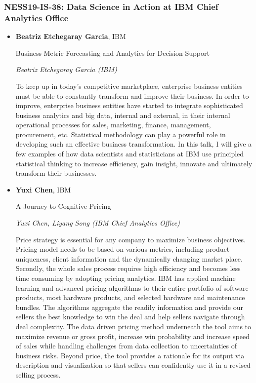 \subsubsection*{NESS19-IS-38: Data Science in Action at IBM Chief Analytics Office}

\begin{itemize}
\item \textbf{Beatriz Etchegaray Garcia}, IBM

Business Metric Forecasting and Analytics for Decision Support

\emph{\footnotesize Beatriz Etchegaray Garcia (IBM)}

To keep up in today's competitive marketplace, enterprise business entities must be able to constantly transform and improve their business. In order to improve, enterprise business entities have started to integrate sophisticated business analytics and big data, internal and external, in their internal operational processes for sales, marketing, finance, management, procurement, etc. Statistical methodology can play a powerful role in developing such an effective business transformation. In this talk, I will give a few examples of how data scientists and statisticians at IBM use principled statistical thinking to increase efficiency, gain insight, innovate and ultimately transform their businesses.

\item \textbf{Yuxi Chen}, IBM

A Journey to Cognitive Pricing

\emph{\footnotesize Yuxi Chen, Liyang Song (IBM Chief Analytics Office)}

Price strategy is essential for any company to maximize business objectives.  Pricing model needs to be based on various metrics, including product uniqueness, client information and the dynamically changing market place. Secondly, the whole sales process requires high efficiency and becomes less time consuming by adopting pricing analytics. IBM has applied machine learning and advanced pricing algorithms to their entire portfolio of software products, most hardware products, and selected hardware and maintenance bundles. The algorithms aggregate the readily information and provide our sellers the best knowledge to win the deal and help sellers navigate through deal complexity. The data driven pricing method underneath the tool aims to maximize revenue or gross profit, increase win probability and increase speed of sales while handling challenges from data collection to uncertainties of business risks. Beyond price, the tool provides a rationale for its output via description and visualization so that sellers can confidently use it in a revised selling process.  


\end{itemize}
